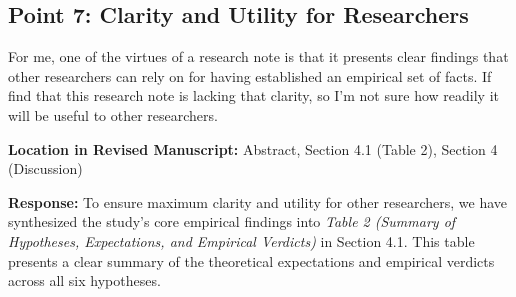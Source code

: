 \documentclass[11pt, letterpaper]{article}
\begin{document}
\subsection*{Point 7: Clarity and Utility for Researchers}

\begin{reviewercomment}
For me, one of the virtues of a research note is that it presents clear findings that other researchers can rely on for having established an empirical set of facts. If find that this research note is lacking that clarity, so I'm not sure how readily it will be useful to other researchers.
\end{reviewercomment}

\textbf{Location in Revised Manuscript:} Abstract, Section 4.1 (Table 2), Section 4 (Discussion)

\textbf{Response:}
To ensure maximum clarity and utility for other researchers, we have synthesized the study's core empirical findings into \textit{Table 2 (Summary of Hypotheses, Expectations, and Empirical Verdicts)} in Section 4.1. This table presents a clear summary of the theoretical expectations and empirical verdicts across all six hypotheses.



\end{document}
